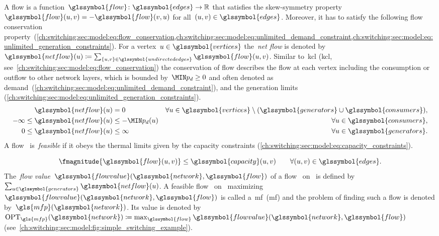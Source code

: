 A flow is a function~$\glssymbol{flow}\colon\glssymbol{edges}\to\reals$ that satisfies
the
%
skew-symmetry property~$\glssymbol{flow}(\vertexa,\vertexb) = -\glssymbol{flow}(\vertexb,\vertexa)$
for all~$(\vertexa,\vertexb)\in\glssymbol{edges}$. 
%
Moreover, it has to satisfy the following flow conservation 
property~(\cref{ch:switching:sec:model:eq:flow_conservation,ch:switching:sec:model:eq:unlimited_demand_constraint,ch:switching:sec:model:eq:unlimited_generation_constraints}).
% 
For a vertex~$\vertexa\in\glssymbol{vertices}$ the~\emph{net flow} is denoted
by~$\glssymbol{netflow}(\vertexa) \coloneqq
\sum_{\{\vertexa,\vertexb\}\in\glssymbol{undirectededges}}\glssymbol{flow} 
(\vertexa,\vertexb)$.
%
Similar to~\acrlong{kcl} (\gls{kcl},
see~\cref{ch:switching:sec:model:eq:flow_conservation}) the conservation of flow
describes the flow at each vertex including the consumption or outflow to other
network layers, which is bounded by~$\realpowerdemandmin\geq 0$ and often
denoted as
demand~(\cref{ch:switching:sec:model:eq:unlimited_demand_constraint}), and
the generation limits
(\cref{ch:switching:sec:model:eq:unlimited_generation_constraints}).
%
\begin{align}%
\glssymbol{netflow}(\vertexa) &= 0 & \forall\vertexa\in
\glssymbol{vertices}\setminus
(\glssymbol{generators}\cup\glssymbol{consumers}),
\label{ch:switching:sec:model:eq:flow_conservation}\\%
%
-\infty\leq\glssymbol{netflow}(\vertexa) &\leq-\realpowerdemandmin(\vertexa) &
\forall\vertexa\in\glssymbol{consumers} ,
\label{ch:switching:sec:model:eq:unlimited_demand_constraint}\\%
%
0\leq\glssymbol{netflow}(\vertexa) &\leq \infty &
\forall\vertexa\in\glssymbol{generators}.%
\label{ch:switching:sec:model:eq:unlimited_generation_constraints}%
\end{align}%
%
A flow~ is~\emph{feasible} if it obeys the thermal limits given
by the capacity constraints
(\cref{ch:switching:sec:model:eq:capacity_constraints}).

\begin{equation}%
  \fmagnitude{\glssymbol{flow}(\vertexa,\vertexb)}\leq\glssymbol{capacity}
  (\vertexa,\vertexb)
  \qquad\forall(\vertexa,\vertexb)\in\glssymbol{edges}.
  \label{ch:switching:sec:model:eq:capacity_constraints}%
\end{equation}%
% 
The~\emph{flow value}~$\glssymbol{flowvalue}(\glssymbol{network},\glssymbol{flow})$ of a
flow~ on~ is defined
by~$\sum_{\vertexa\in\glssymbol{generators}}\glssymbol{netflow}(\vertexa)$. A
feasible flow~ on~
maximizing~$\glssymbol{flowvalue}(\glssymbol{network},\glssymbol{flow})$ is
called a~\acrlong{mf}~(\gls{mf}) and the problem of finding such a flow is
denoted by~$\gls{mfp}(\glssymbol{network})$. Its value is denoted
by~$\opt_{\gls{mfp}}(\glssymbol{network}) \coloneqq \max_{\glssymbol{flow}}
\glssymbol{flowvalue}(\glssymbol{network},\glssymbol{flow})$
(see~\cref{ch:switching:sec:model:fig:simple_switching_example}).%


